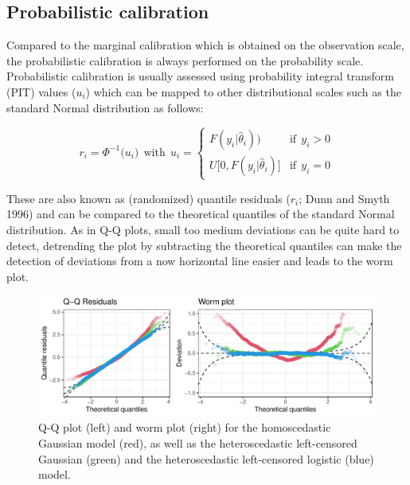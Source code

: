 \documentclass[twoside]{report}
\begin{document}
\subsection{Probabilistic calibration}

Compared to the marginal calibration which is obtained on the observation scale,
the probabilistic calibration is always performed on the probability scale.
Probabilistic calibration is usually assessed using probability integral
transform (PIT) values ($u_i$) which can be mapped to other distributional scales
such as the standard Normal distribution as follows:

$$
r_i = \Phi^{-1}\big(u_i)~~\text{with}~~u_i = \begin{cases}
     F(y_i | \hat{\theta}_i)\big) & \text{if}~~y_i > 0 \\
     U\big[0, F(y_i | \hat{\theta}_i)\big] & \text{if}~~y_i = 0
\end{cases}
$$

These are also known as (randomized) quantile residuals ($r_i$; Dunn and Smyth 1996)
and can be compared to the theoretical quantiles of the standard Normal
distribution. 
As in Q-Q plots, small too medium deviations can be quite hard to detect,
detrending the plot by subtracting the theoretical quantiles can make 
the detection of deviations from a now horizontal line easier and leads
to the worm plot.

\begin{figure}[!ht]\centering
    \includegraphics[width=\textwidth]{Stauffer-qqresiduals}
    \caption{\label{stauffer:fig2} 
        Q-Q plot (left) and worm plot (right) for the homoscedastic
        Gaussian model (red), as well as the heteroscedastic left-censored
        Gaussian (green) and the heteroscedastic left-censored logistic (blue) model.
    }
\end{figure}

\end{document}

